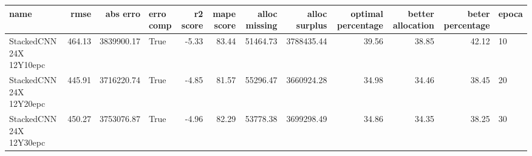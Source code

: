 \begin{tabular}{lrrlrrrrrrrl}
\toprule
name & rmse & abs erro & erro comp & r2 score & mape score & alloc missing & alloc surplus & optimal percentage & better allocation & beter percentage & epoca \\
\midrule
StackedCNN 24X 12Y10epc & 464.13 & 3839900.17 & True & -5.33 & 83.44 & 51464.73 & 3788435.44 & 39.56 & 38.85 & 42.12 & 10 \\
StackedCNN 24X 12Y20epc & 445.91 & 3716220.74 & True & -4.85 & 81.57 & 55296.47 & 3660924.28 & 34.98 & 34.46 & 38.45 & 20 \\
StackedCNN 24X 12Y30epc & 450.27 & 3753076.87 & True & -4.96 & 82.29 & 53778.38 & 3699298.49 & 34.86 & 34.35 & 38.25 & 30 \\
\bottomrule
\end{tabular}
